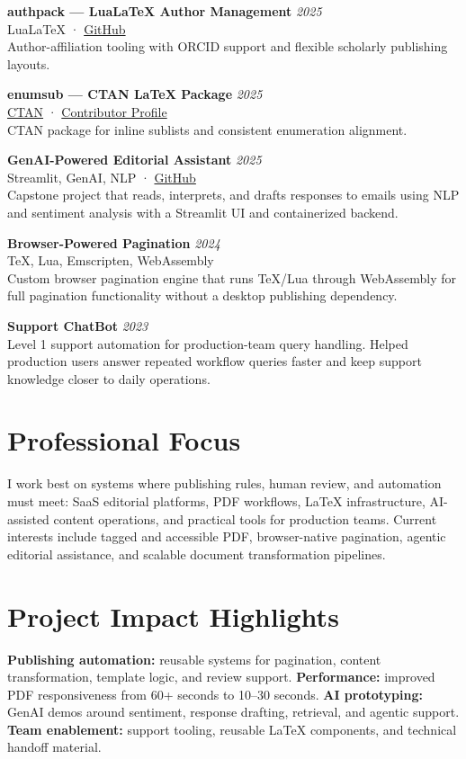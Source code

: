 \documentclass[10pt]{article}
\begin{document}
\textbf{authpack — LuaLaTeX Author Management} \hfill \textit{2025}\\
LuaLaTeX · \href{https://github.com/Srikanth-Mohankumar/latex-authpack}{GitHub}\\
Author-affiliation tooling with ORCID support and flexible scholarly publishing layouts.

\textbf{enumsub — CTAN LaTeX Package} \hfill \textit{2025}\\
\href{https://ctan.org/pkg/enumsub}{CTAN} · \href{https://ctan.org/author/mohankumar}{Contributor Profile}\\
CTAN package for inline sublists and consistent enumeration alignment.

\textbf{GenAI-Powered Editorial Assistant} \hfill \textit{2025}\\
Streamlit, GenAI, NLP · \href{https://github.com/Srikanth-Mohankumar/email-sentiment-analysis}{GitHub}\\
Capstone project that reads, interprets, and drafts responses to emails using NLP and sentiment analysis with a Streamlit UI and containerized backend.

\textbf{Browser-Powered Pagination} \hfill \textit{2024}\\
TeX, Lua, Emscripten, WebAssembly\\
Custom browser pagination engine that runs TeX/Lua through WebAssembly for full pagination functionality without a desktop publishing dependency.

\textbf{Support ChatBot} \hfill \textit{2023}\\
Level 1 support automation for production-team query handling. Helped production users answer repeated workflow queries faster and keep support knowledge closer to daily operations.

\section*{Professional Focus}
I work best on systems where publishing rules, human review, and automation must meet: SaaS editorial platforms, PDF workflows, LaTeX infrastructure, AI-assisted content operations, and practical tools for production teams. Current interests include tagged and accessible PDF, browser-native pagination, agentic editorial assistance, and scalable document transformation pipelines.

\section*{Project Impact Highlights}
\textbf{Publishing automation:} reusable systems for pagination, content transformation, template logic, and review support. \textbf{Performance:} improved PDF responsiveness from 60+ seconds to 10--30 seconds. \textbf{AI prototyping:} GenAI demos around sentiment, response drafting, retrieval, and agentic support. \textbf{Team enablement:} support tooling, reusable LaTeX components, and technical handoff material.
\end{document}
